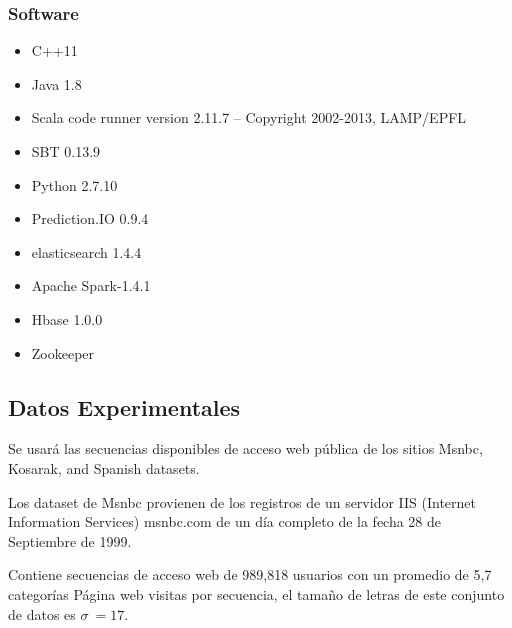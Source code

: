 \subsubsection{Software}

\begin{itemize}
	\item C++11
	\item Java  1.8
	\item Scala code runner version 2.11.7 -- Copyright 2002-2013, LAMP/EPFL
	\item SBT 0.13.9 
	\item Python 2.7.10
	\item Prediction.IO 0.9.4
	\item elasticsearch 1.4.4	
	\item Apache Spark-1.4.1
	\item Hbase 1.0.0
	\item Zookeeper 

\end{itemize}


\subsection{Datos Experimentales}

Se usará las secuencias disponibles de acceso web pública de los sitios Msnbc, Kosarak, and Spanish datasets. 

Los dataset de Msnbc provienen de los registros de un servidor IIS (Internet Information Services) msnbc.com de un día completo de la fecha  28 de Septiembre de 1999. 

Contiene secuencias de acceso web de 989,818 usuarios con un promedio de 5,7  categorías Página web visitas por secuencia, el tamaño de letras de este conjunto de datos es $\sigma \ = 17$.








